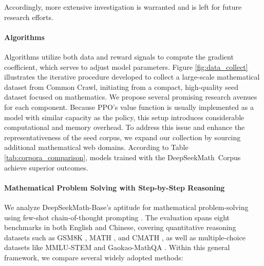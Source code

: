 Accordingly, more extensive investigation is warranted and is left for future research efforts. \paragraph{Algorithms} Algorithms utilize both data and reward signals to compute the gradient coefficient, which serves to adjust model parameters. Figure \ref{fig:data_collect} illustrates the iterative procedure developed to collect a large-scale mathematical dataset from Common Crawl, initiating from a compact, high-quality seed dataset focused on mathematics. We propose several promising research avenues for each component. Because PPO’s value function is usually implemented as a model with similar capacity as the policy, this setup introduces considerable computational and memory overhead. To address this issue and enhance the representativeness of the seed corpus, we expand our collection by sourcing additional mathematical web domains. According to Table \ref{tab:corpora_comparison}, models trained with the DeepSeekMath~Corpus achieve superior outcomes. \paragraph{Mathematical Problem Solving with Step-by-Step Reasoning}

We analyze DeepSeekMath-Base’s aptitude for mathematical problem-solving using few-shot chain-of-thought prompting \citep{cot}. The evaluation spans eight benchmarks in both English and Chinese, covering quantitative reasoning datasets such as GSM8K \citep{gsm8k}, MATH \citep{MATH}, and CMATH \citep{wei2023cmath}, as well as multiple-choice datasets like MMLU-STEM \citep{mmlu} and Gaokao-MathQA \citep{agieval}. Within this general framework, we compare several widely adopted methods:

